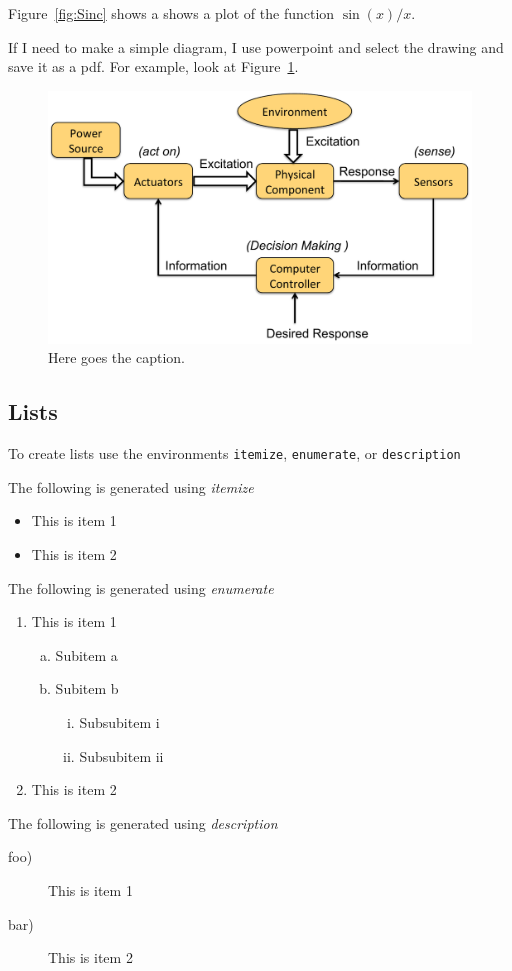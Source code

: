 \documentclass{UoNMCHA}
\numberwithin{equation}{section}
\begin{document}
Figure~\ref{fig:Sinc} shows a shows a plot of the function $\sin(x)/x$. 

If I need to make a simple diagram, I use powerpoint and select the drawing and save it as a pdf. For example, look at Figure~\ref{fig:MechaSys}.
\begin{figure}[ht]
    \begin{center}
        \includegraphics[width=.6\linewidth]{Figures/MechaSys}
        \caption{Here goes the caption.}
        \label{fig:MechaSys}
    \end{center}
\end{figure}
\newpage
\subsection{Lists}
To create lists use the environments \verb|itemize|, \verb|enumerate|, or \verb|description|

The following is generated using \emph{itemize}
\begin{itemize}
    \item This is item 1 
    \item This is item 2
\end{itemize}
%
The following is generated using \emph{enumerate}
\begin{enumerate}[1)]
    \item This is item 1 
    \begin{enumerate}[a)]
        \item Subitem a
        \item Subitem b
        \begin{enumerate}[i)]
            \item Subsubitem i
            \item Subsubitem ii
        \end{enumerate}
    \end{enumerate}
    \item This is item 2
\end{enumerate}
%
The following is generated using \emph{description}
\begin{description}
    \item[foo)] This is item 1 
    \item[bar)] This is item 2
\end{description}
\end{document}
